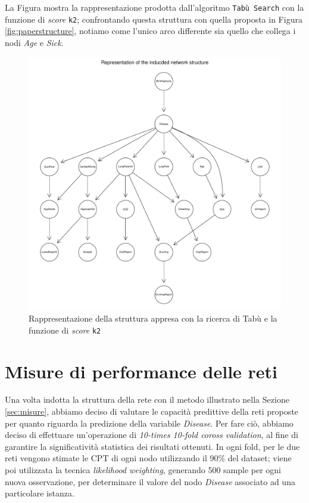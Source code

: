 La Figura mostra la rappresentazione prodotta dall'algoritmo \texttt{Tabù Search} con la funzione di \textit{score} \texttt{k2}; confrontando questa struttura con quella proposta in Figura \ref{fig:paperstructure}, notiamo come l'unico arco differente sia quello che collega i nodi \textit{Age} e \textit{Sick}.

\begin{figure}
	\centering
	\includegraphics[width=.9\linewidth]{images/induced_structure}
	\caption{Rappresentazione della struttura appresa con la ricerca di Tabù e la funzione di \textit{score} \texttt{k2}}
	\label{fig:inducedstructure}
\end{figure}

\newpage
\section{Misure di performance delle reti}
\label{sec:performance}
Una volta indotta la struttura della rete con il metodo illustrato nella Sezione \ref{sec:misure}, abbiamo deciso di valutare le capacità predittive della reti proposte per quanto riguarda la predizione della variabile \textit{Disease}. Per fare ciò, abbiamo deciso di effettuare un'operazione di \textit{10-times 10-fold coross validation}, al fine di garantire la significatività statistica dei risultati ottenuti. In ogni fold, per le due reti vengono stimate le CPT di ogni nodo utilizzando il $90\%$ del dataset; viene poi utilizzata la tecnica \textit{likelihood weighting}, generando 500 sample per ogni nuova osservazione, per determinare il valore del nodo \textit{Disease} associato ad una particolare istanza.

